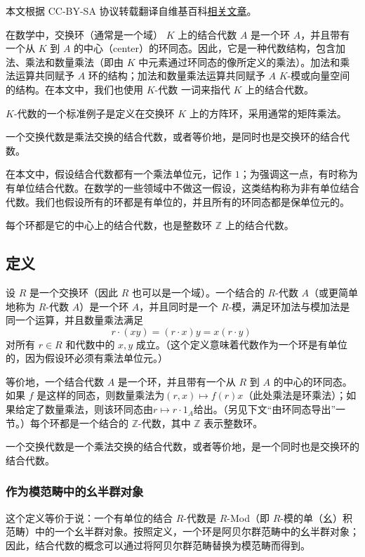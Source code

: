 
本文根据 CC-BY-SA 协议转载翻译自维基百科\href{https://en.wikipedia.org/wiki/Associative_algebra}{相关文章}。

在数学中，交换环（通常是一个域） $K$ 上的结合代数 $A$ 是一个环 $A$，并且带有一个从 $K$ 到 $A$ 的中心（center）的环同态。因此，它是一种代数结构，包含加法、乘法和数量乘法（即由 $K$ 中元素通过环同态的像所定义的乘法）。加法和乘法运算共同赋予 $A$ 环的结构；加法和数量乘法运算共同赋予 $A$ $K$-模或向量空间的结构。在本文中，我们也使用 $K$-代数 一词来指代 $K$ 上的结合代数。

$K$-代数的一个标准例子是定义在交换环 $K$ 上的方阵环，采用通常的矩阵乘法。

一个交换代数是乘法交换的结合代数，或者等价地，是同时也是交换环的结合代数。

在本文中，假设结合代数都有一个乘法单位元，记作 $1$；为强调这一点，有时称为有单位结合代数。在数学的一些领域中不做这一假设，这类结构称为非有单位结合代数。我们也假设所有的环都是有单位的，并且所有的环同态都是保单位元的。

每个环都是它的中心上的结合代数，也是整数环 $\mathbb{Z}$ 上的结合代数。
\subsection{定义}
设 $R$ 是一个交换环（因此 $R$ 也可以是一个域）。一个结合的 $R$-代数 $A$（或更简单地称为 $R$-代数 $A$）是一个环 $A$，并且同时是一个 $R$-模，满足环加法与模加法是同一个运算，并且数量乘法满足
$$
r \cdot (xy) = (r \cdot x)y = x(r \cdot y)~
$$
对所有 $r \in R$ 和代数中的 $x, y$ 成立。（这个定义意味着代数作为一个环是有单位的，因为假设环必须有乘法单位元。）

等价地，一个结合代数 $A$ 是一个环，并且带有一个从 $R$ 到 $A$ 的中心的环同态。如果 $f$ 是这样的同态，则数量乘法为$(r, x) \mapsto f(r) x$（此处乘法是环乘法）；如果给定了数量乘法，则该环同态由$r \mapsto r \cdot 1_A$给出。（另见下文“由环同态导出”一节。）每个环都是一个结合的 $\mathbb{Z}$-代数，其中 $\mathbb{Z}$ 表示整数环。

一个交换代数是一个乘法交换的结合代数，或者等价地，是一个同时也是交换环的结合代数。
\subsubsection{作为模范畴中的幺半群对象}
这个定义等价于说：一个有单位的结合 $R$-代数是 $R$-Mod（即 $R$-模的单（幺）积范畴）中的一个幺半群对象。按照定义，一个环是阿贝尔群范畴中的幺半群对象；因此，结合代数的概念可以通过将阿贝尔群范畴替换为模范畴而得到。

